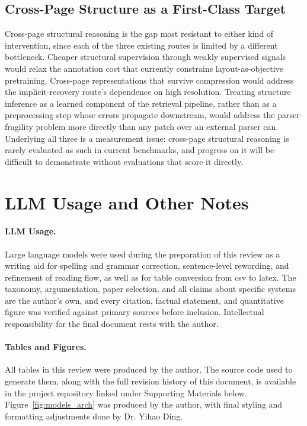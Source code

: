 \documentclass[11pt]{article}
\begin{document}
\subsection{Cross-Page Structure as a First-Class Target}
Cross-page structural reasoning is the gap most resistant to either kind of intervention, since each of the three existing routes is limited by a different bottleneck. Cheaper structural supervision through weakly supervised signals would relax the annotation cost that currently constrains layout-as-objective pretraining. Cross-page representations that survive compression would address the implicit-recovery route's dependence on high resolution. Treating structure inference as a learned component of the retrieval pipeline, rather than as a preprocessing step whose errors propagate downstream, would address the parser-fragility problem more directly than any patch over an external parser can. Underlying all three is a measurement issue: cross-page structural reasoning is rarely evaluated as such in current benchmarks, and progress on it will be difficult to demonstrate without evaluations that score it directly.

\section*{LLM Usage and Other Notes}

\paragraph{LLM Usage.}
Large language models were used during the preparation of this review as a writing aid for spelling and grammar correction, sentence-level rewording, and refinement of reading flow, as well as for table conversion from csv to latex. The taxonomy, argumentation, paper selection, and all claims about specific systems are the author's own, and every citation, factual statement, and quantitative figure was verified against primary sources before inclusion. Intellectual responsibility for the final document rests with the author.

\paragraph{Tables and Figures.}
All tables in this review were produced by the author. The source code used to generate them, along with the full revision history of this document, is available in the project repository linked under Supporting Materials below. Figure~\ref{fig:models_arch} was produced by the author, with final styling and formatting adjustments done by Dr. Yihao Ding.
\end{document}
